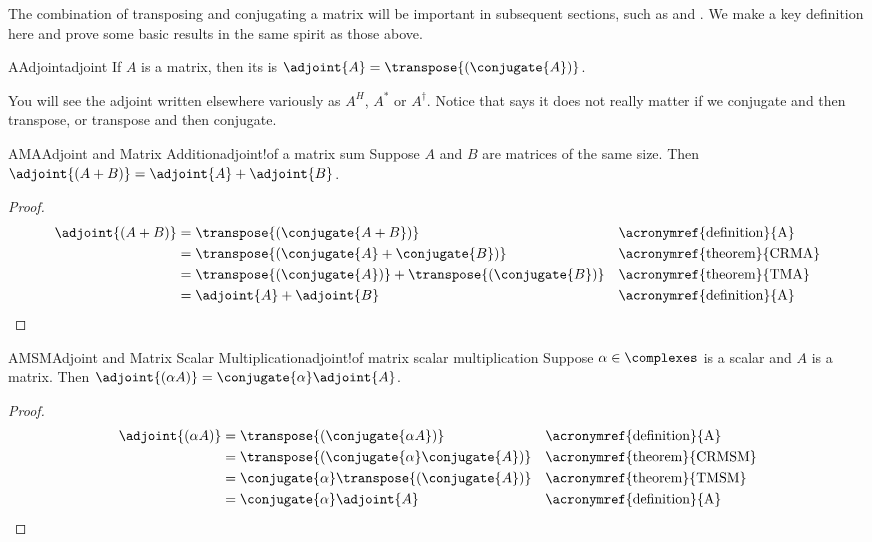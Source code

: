 %
The combination of transposing and conjugating a matrix will be important in subsequent sections, such as  and .  We make a key definition here and prove some basic results in the same spirit as those above.
%
\begin{definition}{A}{Adjoint}{adjoint}
If $A$ is a matrix, then its  is
$\adjoint{A}=\transpose{\left(\conjugate{A}\right)}$.
\end{definition}
%
You will see the adjoint written elsewhere variously as $A^H$, $A^\ast$ or $A^\dagger$.  Notice that  says it does not really matter if we conjugate and then transpose, or transpose and then conjugate.
%
\begin{theorem}{AMA}{Adjoint and Matrix Addition}{adjoint!of a matrix sum}
Suppose $A$ and $B$ are matrices of the same size.  Then $\adjoint{\left(A+B\right)}=\adjoint{A}+\adjoint{B}$.
\end{theorem}
%
\begin{proof}
%
\begin{align*}
\adjoint{\left(A+B\right)}
&=\transpose{\left(\conjugate{A+B}\right)}
&&\text{\acronymref{definition}{A}}\\
%
&=\transpose{\left(\conjugate{A}+\conjugate{B}\right)}
&&\text{\acronymref{theorem}{CRMA}}\\
%
&=\transpose{\left(\conjugate{A}\right)}+\transpose{\left(\conjugate{B}\right)}
&&\text{\acronymref{theorem}{TMA}}\\
%
&=\adjoint{A}+\adjoint{B}
&&\text{\acronymref{definition}{A}}
%
\end{align*}
%
\end{proof}
%
\begin{theorem}{AMSM}{Adjoint and Matrix Scalar Multiplication}{adjoint!of matrix scalar multiplication}
Suppose $\alpha\in\complexes$ is a scalar and $A$ is a matrix.  Then $\adjoint{\left(\alpha A\right)}=\conjugate{\alpha}\adjoint{A}$.
\end{theorem}
%
\begin{proof}
%
\begin{align*}
\adjoint{\left(\alpha A\right)}
&=\transpose{\left(\conjugate{\alpha A}\right)}
&&\text{\acronymref{definition}{A}}\\
%
&=\transpose{\left(\conjugate{\alpha}\conjugate{A}\right)}
&&\text{\acronymref{theorem}{CRMSM}}\\
%
&=\conjugate{\alpha}\transpose{\left(\conjugate{A}\right)}
&&\text{\acronymref{theorem}{TMSM}}\\
%
&=\conjugate{\alpha}\adjoint{A}
&&\text{\acronymref{definition}{A}}
%
\end{align*}
%
\end{proof}
